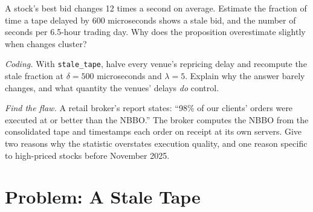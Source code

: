 \begin{exercise}[$\star\star$]\label{exo:m1:us-equity-market-structure:6}
A stock's best bid changes 12 times a second on average. Estimate the
fraction of time a tape delayed by 600 microseconds shows a stale bid, and
the number of seconds per 6.5-hour trading day. Why does the proposition
overestimate slightly when changes cluster?
\end{exercise}

\begin{exercise}[$\star\star\star$]\label{exo:m1:us-equity-market-structure:7}
\emph{Coding.} With \texttt{stale\_tape}, halve every venue's repricing delay
and recompute the stale fraction at $\delta = 500$ microseconds and $\lambda =
5$. Explain why the answer barely changes, and what quantity the venues'
delays \emph{do} control.
\end{exercise}

\begin{exercise}[$\star\star\star$]\label{exo:m1:us-equity-market-structure:8}
\emph{Find the flaw.} A retail broker's report states: ``98\% of our clients'
orders were executed at or better than the NBBO.'' The broker computes the
NBBO from the consolidated tape and timestamps each order on receipt at its
own servers. Give two reasons why the statistic overstates execution quality,
and one reason specific to high-priced stocks before November 2025.
\end{exercise}

\section{Problem: A Stale Tape}

